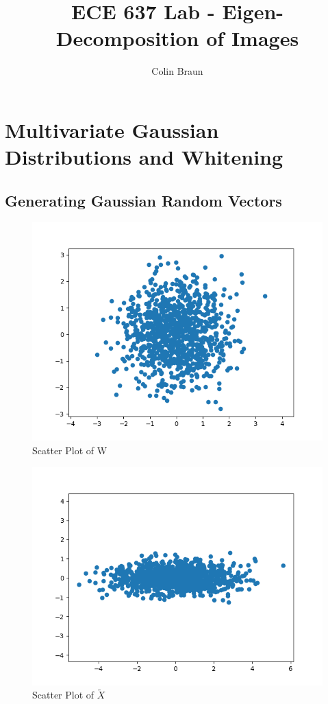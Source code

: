 \documentclass{article}
\title{ECE 637 Lab - Eigen-Decomposition of Images}
\author{Colin Braun}
\begin{document}
\maketitle

\section{Multivariate Gaussian Distributions and Whitening}
\subsection{Generating Gaussian Random Vectors}
\begin{figure}[H]
    \centering
    \includegraphics[width=1\textwidth]{../w-2-1.png}
    \caption{Scatter Plot of W}
\end{figure}
\begin{figure}[H]
    \centering
    \includegraphics[width=1\textwidth]{../x-tilde-2-1.png}
    \caption{Scatter Plot of $\tilde{X}$}
\end{figure}
\end{document}
